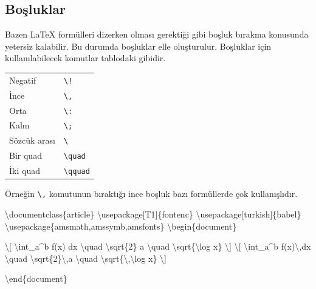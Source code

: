 \documentclass[
  letterpaper,
  DIV=11,
  numbers=noendperiod]{scrreprt}
\newenvironment{Shaded}{\begin{snugshade}}{\end{snugshade}}
\newcommand{\BuiltInTok}[1]{\textcolor[rgb]{0.00,0.23,0.31}{#1}}
\newcommand{\ExtensionTok}[1]{\textcolor[rgb]{0.00,0.23,0.31}{#1}}
\newcommand{\KeywordTok}[1]{\textcolor[rgb]{0.00,0.23,0.31}{#1}}
\newcommand{\NormalTok}[1]{\textcolor[rgb]{0.00,0.23,0.31}{#1}}
\newcommand{\SpecialCharTok}[1]{\textcolor[rgb]{0.37,0.37,0.37}{#1}}
\newcommand{\SpecialStringTok}[1]{\textcolor[rgb]{0.13,0.47,0.30}{#1}}
\begin{document}
\hypertarget{boux15fluklar-1}{%
\subsection{Boşluklar}\label{boux15fluklar-1}}

Bazen {\LaTeX} formülleri dizerken olması gerektiği gibi boşluk bırakma
konusunda yetersiz kalabilir. Bu durumda boşluklar elle oluşturulur.
Boşluklar için kullanılabilecek komutlar tablodaki gibidir.

\begin{longtable}[]{@{}ll@{}}
\toprule()
\endhead
Negatif & \texttt{\textbackslash{}!} \\
İnce & \texttt{\textbackslash{},} \\
Orta & \texttt{\textbackslash{}:} \\
Kalın & \texttt{\textbackslash{};} \\
Sözcük arası & \texttt{\textbackslash{}} \\
Bir quad & \texttt{\textbackslash{}quad} \\
İki quad & \texttt{\textbackslash{}qquad} \\
\bottomrule()
\end{longtable}

Örneğin \texttt{\textbackslash{},} komutunun bıraktığı ince boşluk bazı
formüllerde çok kullanışlıdır.

\begin{Shaded}
\begin{Highlighting}[]
\BuiltInTok{\textbackslash{}documentclass}\NormalTok{\{}\ExtensionTok{article}\NormalTok{\}}
\BuiltInTok{\textbackslash{}usepackage}\NormalTok{[T1]\{}\ExtensionTok{fontenc}\NormalTok{\}}
\BuiltInTok{\textbackslash{}usepackage}\NormalTok{[turkish]\{}\ExtensionTok{babel}\NormalTok{\}}
\BuiltInTok{\textbackslash{}usepackage}\NormalTok{\{}\ExtensionTok{amsmath,amssymb,amsfonts}\NormalTok{\}}
\KeywordTok{\textbackslash{}begin}\NormalTok{\{}\ExtensionTok{document}\NormalTok{\}}

\SpecialStringTok{\textbackslash{}[}
\SpecialCharTok{\textbackslash{}int}\SpecialStringTok{\_a\^{}b f(x) dx }\SpecialCharTok{\textbackslash{}quad}\SpecialStringTok{ }\SpecialCharTok{\textbackslash{}sqrt}\SpecialStringTok{\{2\} a}
\SpecialCharTok{\textbackslash{}quad}\SpecialStringTok{ }\SpecialCharTok{\textbackslash{}sqrt}\SpecialStringTok{\{}\SpecialCharTok{\textbackslash{}log}\SpecialStringTok{ x\}}
\SpecialStringTok{\textbackslash{}]}
\SpecialStringTok{\textbackslash{}[}
\SpecialCharTok{\textbackslash{}int}\SpecialStringTok{\_a\^{}b f(x)}\SpecialCharTok{\textbackslash{},}\SpecialStringTok{dx }\SpecialCharTok{\textbackslash{}quad}
\SpecialCharTok{\textbackslash{}sqrt}\SpecialStringTok{\{2\}}\SpecialCharTok{\textbackslash{},}\SpecialStringTok{a }\SpecialCharTok{\textbackslash{}quad}\SpecialStringTok{ }\SpecialCharTok{\textbackslash{}sqrt}\SpecialStringTok{\{}\SpecialCharTok{\textbackslash{},\textbackslash{}log}\SpecialStringTok{ x\}}
\SpecialStringTok{\textbackslash{}]}

\KeywordTok{\textbackslash{}end}\NormalTok{\{}\ExtensionTok{document}\NormalTok{\}}
\end{Highlighting}
\end{Shaded}
\end{document}
